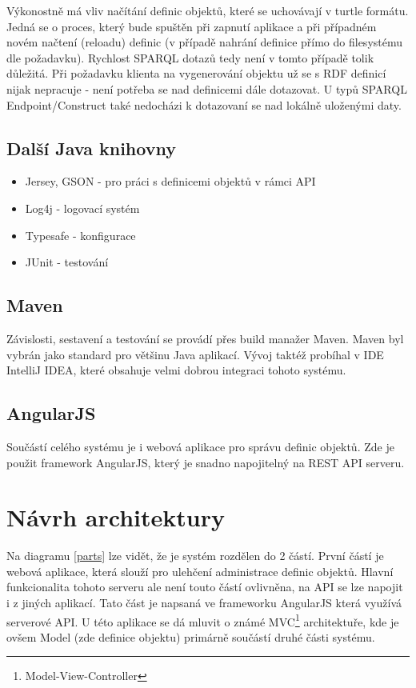 \documentclass[thesis=B,czech]{FITthesis}[2012/06/26]
\begin{document}
   Výkonostně má vliv načítání definic objektů, které se uchovávají v turtle formátu. Jedná se o proces, který bude spuštěn při zapnutí aplikace a při
   případném novém načtení (reloadu) definic (v případě nahrání definice přímo do filesystému dle požadavku). Rychlost SPARQL dotazů tedy není v tomto
   případě tolik důležitá. Při požadavku klienta na vygenerování objektu už se s RDF definicí nijak nepracuje - není potřeba se nad definicemi dále dotazovat.
   U typů SPARQL Endpoint/Construct také nedocházi k dotazovaní se nad lokálně uloženými daty.
   
   \subsection{Další Java knihovny}
   \begin{itemize}
    \item Jersey, GSON - pro práci s definicemi objektů v rámci API
    \item Log4j - logovací systém
    \item Typesafe - konfigurace
    \item JUnit - testování
   \end{itemize}
   
   \subsection{Maven}
   Závislosti, sestavení a testování se provádí přes build manažer Maven. Maven byl vybrán jako standard pro většinu Java aplikací.
   Vývoj taktéž probíhal v IDE IntelliJ IDEA, které obsahuje velmi dobrou integraci tohoto systému.
   
   \subsection{AngularJS}
   Součástí celého systému je i webová aplikace pro správu definic objektů. Zde je použit framework AngularJS, který je snadno napojitelný
   na REST API serveru. 

   \newpage
   
 \section{Návrh architektury}
  Na diagramu \ref{parts} lze vidět, že je systém rozdělen do 2 částí. První částí je webová aplikace, která slouží pro ulehčení administrace definic objektů.
  Hlavní funkcionalita tohoto serveru ale není touto částí ovlivněna, na API se lze napojit i z jiných aplikací.
  Tato část je napsaná ve frameworku AngularJS která využívá serverové API.
  U této aplikace se dá mluvit o známé MVC\footnote{Model-View-Controller} architektuře, kde je ovšem Model (zde definice objektu)
  primárně součástí druhé části systému.
  
\end{document}
